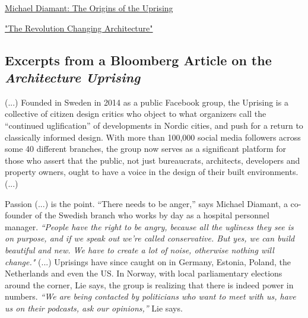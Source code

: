 \documentclass[a4paper]{article}
\begin{document}
\noindent
\begin{minipage}[t]{0.49\linewidth}
    \centering
    \href{https://youtu.be/a9uLNxyKgCE?si=srT0AzgzI3LR4ccr}{Michael Diamant: The Origins of the Uprising}
\end{minipage}%
\hfill
\begin{minipage}[t]{0.49\linewidth}
    \centering
    \href{https://youtu.be/NTGQ_kITzmY?si=yEBpKZUstUKUUOqp}{"The Revolution Changing Architecture"}
\end{minipage}

\subsection{Excerpts from a Bloomberg Article \cite{gersten_nordic_2023} on the \textit{Architecture Uprising}}

(...) Founded in Sweden in 2014 as a public Facebook group, the Uprising is a collective of citizen design critics who object to what organizers call the “continued uglification” of developments in Nordic cities, and push for a return to classically informed design. With more than 100,000 social media followers across some 40 different branches, the group now serves as a significant platform for those who assert that the public, not just bureaucrats, architects, developers and property owners, ought to have a voice in the design of their built environments. (...)

Passion (...) is the point. “There needs to be anger,” says Michael Diamant, a co-founder of the Swedish branch who works by day as a hospital personnel manager. \textit{“People have the right to be angry, because all the ugliness they see is on purpose, and if we speak out we’re called conservative. But yes, we can build beautiful and new. We have to create a lot of noise, otherwise nothing will change." }(...) Uprisings have since caught on in Germany, Estonia, Poland, the Netherlands and even the US. In Norway, with local parliamentary elections around the corner, Lie says, the group is realizing that there is indeed power in numbers. \textit{“We are being contacted by politicians who want to meet with us, have us on their podcasts, ask our opinions,”} Lie says.
\end{document}
